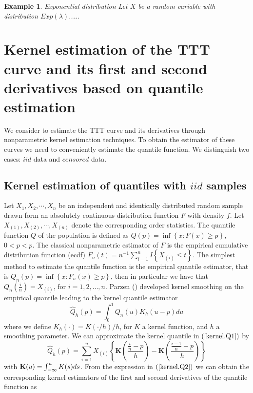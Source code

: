 \documentclass[preprint,12pt]{elsarticle}
\newtheorem{ex}{{\sc Example}}[section]
\begin{document}
\begin{ex}\label{expon}{Exponential distribution}
Let $X$ be a random variable with distribution $Exp(\lambda)$.....
\end{ex}

\section{Kernel estimation of the TTT curve and its first and second derivatives based on quantile estimation}
We consider to estimate the TTT curve and its derivatives through nonparametric kernel estimation techniques. To obtain the estimator of these curves we need to conveniently estimate the quantile function. We distinguish two cases: $iid$ data and $censored$ data.

\subsection{Kernel estimation of quantiles with $iid$ samples}
Let $X_1,X_2,\cdots,X_n$ be an independent and identically distributed random sample drawn form an absolutely continuous distribution function $F$ with density $f$. Let $X_{(1)},X_{(2)},\cdots,X_{(n)}$ denote the corresponding order statistics. The quantile function $Q$ of the population is defined as $Q(p)=\inf \left\{x: F(x) \geq p\right\}$, $0<p<p$. The classical nonparametric estimator of $F$ is the empirical cumulative distribution function (ecdf) $F_n(t)=n^{-1}\sum_{i=1}^n I\left\{X_{(i)}\leq t\right\}$. The simplest method to estimate the quantile function is the empirical quantile estimator, that is $Q_n(p)=\inf \left\{x: F_n(x) \geq p\right\}$, then in particular we have that $Q_n\left(\frac{i}{n}\right)=X_{(i)}$, for $i=1,2,\ldots, n$. Parzen () developed kernel smoothing on the empirical quantile leading to the kernel quantile estimator
\begin{equation}\label{kernel.Q1}
\widehat{Q}_h(p)=\int_0^1 Q_n(u)K_h(u-p)du
\end{equation}
where we define $K_h(\cdot)=K(\cdot/h)/h$, for $K$ a kernel function, and $h$ a smoothing parameter. We can approximate the kernel quantile in $(\ref{kernel.Q1})$ by
\begin{equation}\label{kernel.Q2}
\widehat{Q}_h(p)=\sum_{i=1}^n X_{(i)}\left\{\textbf{K}\left(\frac{\frac{i}{n}-p}{h}\right)-\textbf{K}\left(\frac{\frac{i-1}{n}-p}{h}\right)\right\}
\end{equation}
with ${\bf K} (u) =\int_{-\infty}^u K(s)ds$. From the expression in $(\ref{kernel.Q2})$ we can obtain the corresponding kernel estimators of the first and second derivatives of the quantile function as
\end{document}
